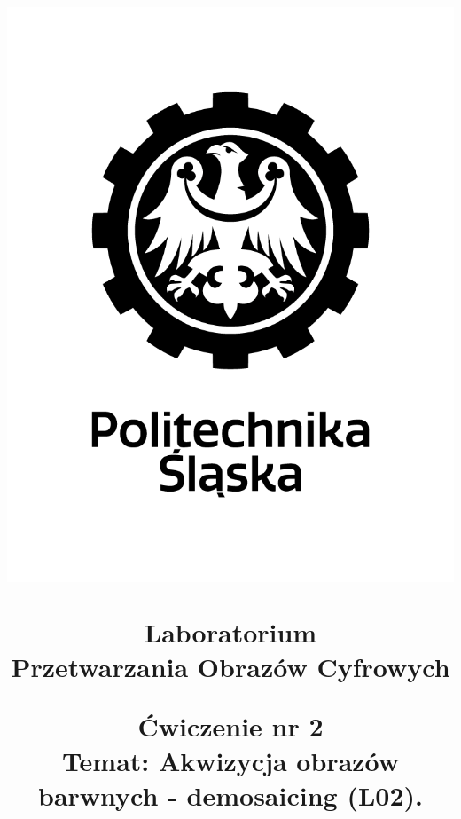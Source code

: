 \title{
\centering

\vspace{-5.0cm} %

\begin{flushright}
    \includegraphics[scale = 0.2, trim={0 0 4.6cm 0}, clip]{./../src/logo/pl/polsl_logo.png}\\ %
\end{flushright}

\vspace*{2.7cm} %

{\fontsize{24}{30}\selectfont\textbf{Laboratorium \\
Przetwarzania Obrazów Cyfrowych}}\\
\vspace*{4.5cm}

{\fontsize{14}{0}\selectfont 
Ćwiczenie nr 2 \\[-1.2em] 
Temat: Akwizycja obrazów barwnych - demosaicing (L02).
}
\vspace*{4.5cm} %
}
